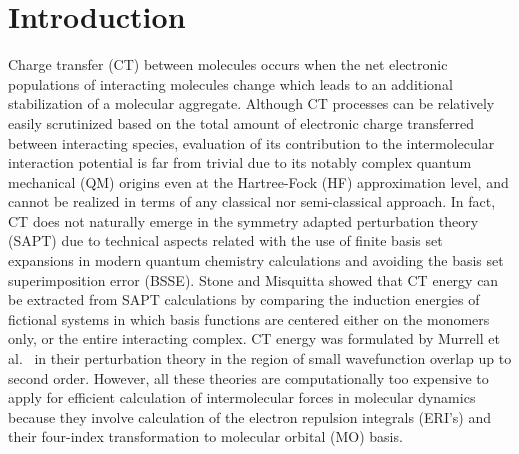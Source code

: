 \documentclass[aip,jcp,amsmath,amssymb,reprint,floatfix]{revtex4-1}
\begin{document}
\pacs{}

\maketitle

\tableofcontents

\section{\label{s:1.introduction}Introduction}

Charge transfer (CT) between molecules occurs when the net electronic populations 
of interacting molecules change which leads to an additional stabilization 
of a molecular aggregate.\cite{Otto.Ladik.IJQC.1980,Stone.TheTheoryOfIntermolecularForces.1996}
Although CT processes can be relatively easily scrutinized based
on the total amount of electronic charge transferred between interacting species,\cite{Otto.Ladik.IJQC.1980}
evaluation of its contribution to the intermolecular interaction
potential\cite{Stone.TheTheoryOfIntermolecularForces.1996} is far from trivial due to 
its notably complex quantum mechanical (QM) origins 
even at the Hartree\hyp{}Fock\cite{Roothaan.RevModPhys.1951} (HF)
approximation level,\cite{Jensen.JCP.2001,Otto.Ladik.ChemPhys.1975}
and cannot be realized in terms of any classical nor semi\hyp{}classical approach.
In fact, CT does not naturally emerge in the symmetry 
adapted perturbation theory\cite{Jeziorski.Moszynski.Szalewicz.ChemRev.1994} (SAPT)
due to technical aspects related with the use of finite basis set expansions
in modern quantum chemistry calculations and avoiding the basis set superimposition error (BSSE). 
Stone and Misquitta showed that CT energy
can be extracted from SAPT calculations by comparing the induction energies
of fictional systems in which basis functions are centered either on the monomers only, or the entire 
interacting complex.\cite{Stone.Misquitta.CPL.2009}
CT energy was formulated by Murrell et al.~\cite{Murrell.Randic.Williams.Longuet-Higgins.ProcRSocLondA.1965} 
in their perturbation theory in the region of small wavefunction overlap up to second order.
However, all these theories are computationally too expensive to apply for efficient
calculation of intermolecular forces in molecular dynamics because
they involve calculation of the electron repulsion integrals (ERI's)
and their four\hyp{}index transformation to molecular orbital (MO) basis.\cite{Otto.Ladik.ChemPhys.1975}
\end{document}
